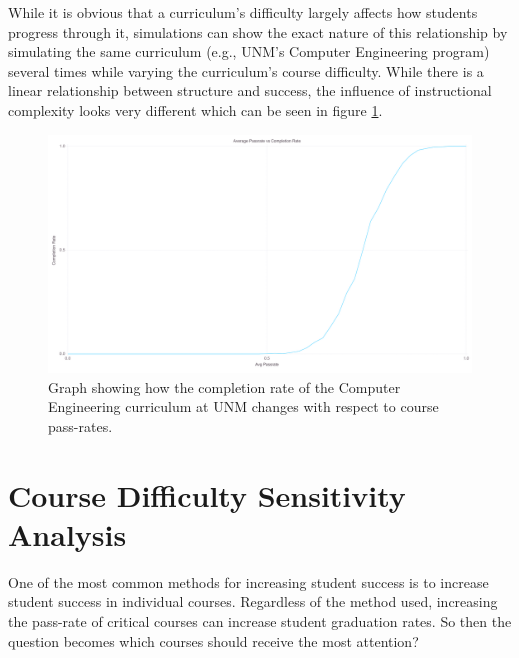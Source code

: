 \documentclass[botnum, fleqn]{unmeethesis}
\begin{document}
    While it is obvious that a curriculum's difficulty largely affects how students progress through it, simulations can show the exact nature of this relationship by simulating the same curriculum (e.g., UNM's Computer Engineering program) several times while varying the curriculum's course difficulty. While there is a linear relationship between structure and success, the influence of instructional complexity looks very different which can be seen in figure \ref{fig:instructional}.

    \begin{figure}[h!]
      \centerline{\includegraphics[scale=0.2]{./figures/instructional.png}}
      \caption{Graph showing how the completion rate of the Computer Engineering curriculum at UNM changes with respect to course pass-rates.}
      \label{fig:instructional}
    \end{figure}

    \section{Course Difficulty Sensitivity Analysis}
      One of the most common methods for increasing student success is to increase student success in individual courses. Regardless of the method used, increasing the pass-rate of critical courses can increase student graduation rates. So then the question becomes which courses should receive the most attention?
\end{document}
